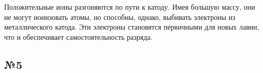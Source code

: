 Положительные ионы разгоняются по пути к катоду. Имея большую массу, они не могут ионизовать атомы, но способны, однако, выбивать электроны из металлического катода. Эти электроны становятся первичными для новых лавин, что и обеспечивает самостоятельность разряда.
\subsection{№5}


\begin{figure}[H]
\begin{minipage}[H]{0.49\linewidth}
\end{minipage}
\hfill
\begin{minipage}[H]{0.49\linewidth}

\end{minipage}
\end{figure}
